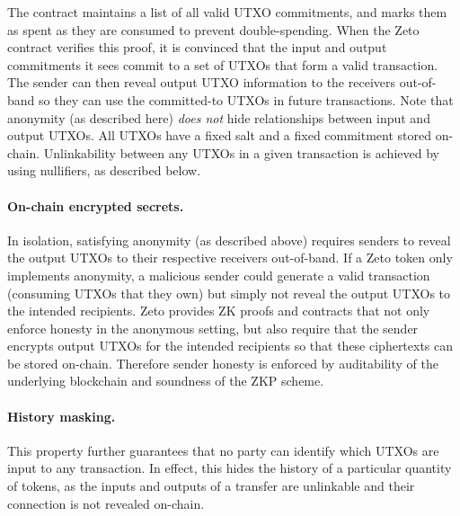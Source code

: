 The contract maintains a list of all valid UTXO commitments, and marks them as spent as they are consumed to prevent double-spending. When the Zeto contract verifies this proof, it is convinced that the input and output commitments it sees commit to a set of UTXOs that form a valid transaction. The sender can then reveal output UTXO information to the receivers out-of-band so they can use the committed-to UTXOs in future transactions. Note that anonymity (as described here) \textit{does not} hide relationships between input and output UTXOs. All UTXOs have a fixed salt and a fixed commitment stored on-chain. Unlinkability between any UTXOs in a given transaction is achieved by using nullifiers, as described below.


\paragraph{On-chain encrypted secrets.} In isolation, satisfying anonymity (as described above) requires senders to reveal the output UTXOs to their respective receivers out-of-band. If a Zeto token only implements anonymity, a malicious sender could generate a valid transaction (consuming UTXOs that they own) but simply not reveal the output UTXOs to the intended recipients. Zeto provides ZK proofs and contracts that not only enforce honesty in the anonymous setting, but also require that the sender encrypts output UTXOs for the intended recipients so that these ciphertexts can be stored on-chain. Therefore sender honesty is enforced by auditability of the underlying blockchain and soundness of the ZKP scheme.


\paragraph{History masking.} This property further guarantees that no party can identify which UTXOs are input to any transaction. In effect, this hides the history of a particular quantity of tokens, as the inputs and outputs of a transfer are unlinkable and their connection is not revealed on-chain.

